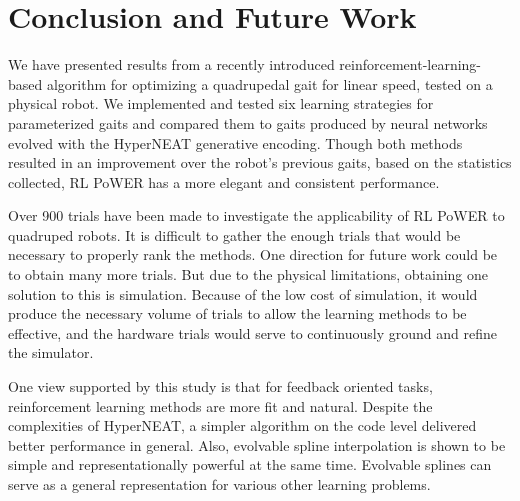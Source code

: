 \section{Conclusion and Future Work}

We have presented results from a recently introduced reinforcement-learning-based algorithm for
optimizing a quadrupedal gait for linear speed, tested on a physical robot.  We implemented and
tested six learning strategies for parameterized gaits and compared
them to gaits produced by neural networks evolved with the HyperNEAT
generative encoding. Though both methods resulted in an improvement
over the robot’s previous \naive gaits, based on the statistics
collected, RL PoWER has a more elegant and consistent performance.

Over 900 trials have been made to investigate the applicability
of RL PoWER to quadruped robots. It is difficult to gather the enough
trials that would be necessary to properly rank the methods. One
direction for future work could be to obtain many more trials. But due
to the physical limitations, obtaining one solution to this is
simulation. Because of the low cost of simulation, it would produce
the necessary volume of trials to allow the learning methods to be
effective, and the hardware trials would serve to continuously ground
and refine the simulator. \cite{glette2012evolution-of-locomotion-in-a-simulated} 

One view supported by this study is that for feedback oriented tasks,
reinforcement learning methods are more fit and natural. Despite the
complexities of HyperNEAT, a simpler algorithm on the code level 
delivered better performance in general.  Also, evolvable spline
interpolation is shown to be simple and representationally powerful at
the same time. Evolvable splines can serve as a general representation for various other
learning problems.
